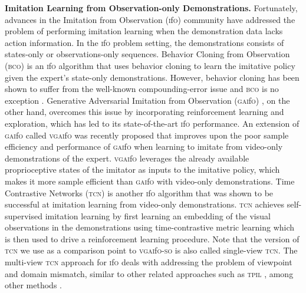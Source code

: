 \documentclass[letterpaper, 10 pt, conference]{ieeeconf}  %
\newcommand{\gaifo}{\textsc{gai}f\textsc{o}}
\newcommand{\ifo}{\textsc{i}f\textsc{o}}
\newcommand{\vgaifo}{\textsc{vgai}f\textsc{o}}
\newcommand{\vgaifoso}{\textsc{vgai}f\textsc{o}-\textsc{so}}
\newcommand{\bco}{\textsc{bco}}
\newcommand{\tcn}{\textsc{tcn}}
\begin{document}
\textbf{Imitation Learning from Observation-only Demonstrations.}
Fortunately, advances in the Imitation from Observation (\ifo{}) community have addressed the problem of performing imitation learning when the demonstration data lacks action information. In the \ifo{} problem setting, the demonstrations consists of states-only or observations-only sequences. Behavior Cloning from Observation (\bco{}) \cite{bco} is an \ifo{} algorithm that uses behavior cloning \cite{behaviorcloning} to learn the imitative policy given the expert's state-only demonstrations. However, behavior cloning has been shown to suffer from the well-known compounding-error issue \cite{ross2011, ross2010} and \bco{} \cite{bco} is no exception \cite{gaifo}.  Generative Adversarial Imitation from Observation (\gaifo{}) \cite{gaifo}, on the other hand, overcomes this issue by incorporating reinforcement learning and exploration, which has led to its state-of-the-art \ifo{} performance.
An extension of \gaifo{} \cite{gaifo} called \vgaifo{} \cite{gaifo_proprio} was recently proposed that improves upon the poor sample efficiency and performance of \gaifo{} when learning to imitate from video-only demonstrations of the expert. \vgaifo{} leverages the already available proprioceptive states of the imitator as inputs to the imitative policy, which makes it more sample efficient than \gaifo{} with video-only demonstrations. 
Time Contrastive Networks (\tcn{}) \cite{tcn} is another \ifo{} algorithm that was shown to be successful at imitation learning from video-only demonstrations.
\tcn{} achieves self-supervised imitation learning by first learning an embedding of the visual observations in the demonstrations using time-contrastive metric learning which is then used to drive a reinforcement learning procedure. Note that the version of \tcn{} we use as a comparison point to \vgaifoso{} is also called single-view \tcn{}. The multi-view \tcn{} approach for \ifo{} deals with addressing the problem of viewpoint and domain mismatch, similar to other related approaches such as \textsc{tpil} \cite{tpil}, among other methods \cite{rlvid, ilpo}. 
\end{document}
